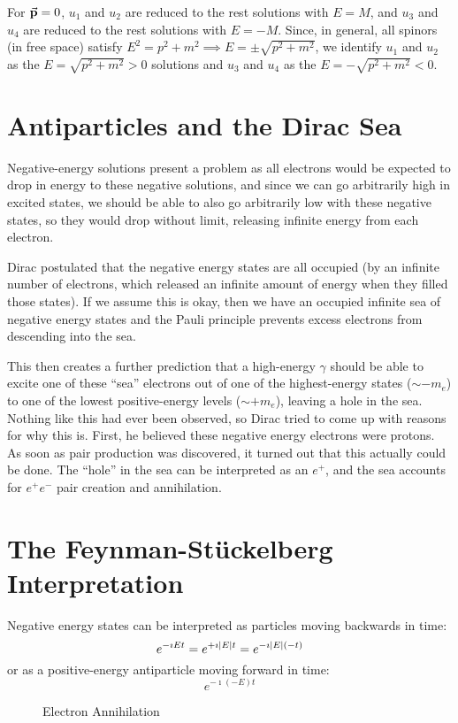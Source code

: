 \documentclass[a4paper,twoside,master.tex]{subfiles}
\begin{document}
For $ \va{p} = 0 $, $ u_1 $ and $ u_2 $ are reduced to the rest solutions with $ E = M $, and $ u_3 $ and $ u_4 $ are reduced to the rest solutions with $ E = -M $. Since, in general, all spinors (in free space) satisfy $ E^2 = p^2 + m^2 \implies E = \pm \sqrt{p^2 + m^2} $, we identify $ u_1 $ and $ u_2 $ as the $ E = \sqrt{p^2 + m^2} > 0 $ solutions and $ u_3 $ and $ u_4 $ as the $ E = - \sqrt{p^2 + m^2} < 0 $. 

\section{Antiparticles and the Dirac Sea}\label{sec:antiparticles_and_the_dirac_sea}

Negative-energy solutions present a problem as all electrons would be expected to drop in energy to these negative solutions, and since we can go arbitrarily high in excited states, we should be able to also go arbitrarily low with these negative states, so they would drop without limit, releasing infinite energy from each electron.

Dirac postulated that the negative energy states are all occupied (by an infinite number of electrons, which released an infinite amount of energy when they filled those states). If we assume this is okay, then we have an occupied infinite sea of negative energy states and the Pauli principle prevents excess electrons from descending into the sea.

This then creates a further prediction that a high-energy $ \gamma $ should be able to excite one of these ``sea'' electrons out of one of the highest-energy states ($ \sim -m_e $) to one of the lowest positive-energy levels ($ \sim +m_e $), leaving a hole in the sea. Nothing like this had ever been observed, so Dirac tried to come up with reasons for why this is. First, he believed these negative energy electrons were protons. As soon as pair production was discovered, it turned out that this actually could be done. The ``hole'' in the sea can be interpreted as an $ e^+ $, and the sea accounts for $ e^{+} e^{-} $ pair creation and annihilation.

\section{The Feynman-St\"uckelberg Interpretation}\label{sec:the_feynman-st\"uckelberg_interpretation}

Negative energy states can be interpreted as particles moving backwards in time:
\begin{equation}
    e^{- \imath E t} = e^{+ \imath \abs{E} t} = e^{- \imath \abs{E} (-t)}
\end{equation}
or as a positive-energy antiparticle moving forward in time:
\begin{equation}
    e^{- \imath (-E) t} 
\end{equation}
\begin{figure}[ht]
    \centering
    \caption{Electron Annihilation}\label{fig:electron-annihilation}
\end{figure}
\end{document}
